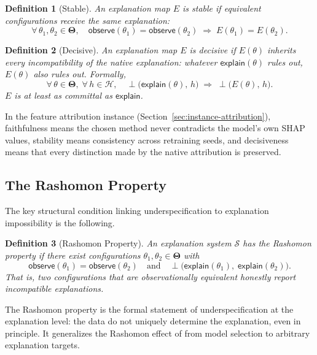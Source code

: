 \documentclass{article}
\newtheorem{definition}{Definition}
\newcommand{\Params}{\mathbf{\Theta}}         %
\newcommand{\sH}{\mathcal{H}}
\newcommand{\incomp}{\perp}                  %
\begin{document}
\begin{definition}[Stable]
\label{def:stable}
An explanation map $E$ is \emph{stable} if equivalent configurations receive
the same explanation:
\[
  \forall\,\theta_1, \theta_2 \in \Params,\quad
  \mathsf{observe}(\theta_1) = \mathsf{observe}(\theta_2)
  \;\Longrightarrow\;
  E(\theta_1) = E(\theta_2).
\]
\end{definition}

\begin{definition}[Decisive]
\label{def:decisive}
An explanation map $E$ is \emph{decisive} if $E(\theta)$ inherits every
incompatibility of the native explanation: whatever
$\mathsf{explain}(\theta)$ rules out, $E(\theta)$ also rules out.  Formally,
\[
  \forall\,\theta \in \Params,\;\forall\,h \in \sH,\quad
  \incomp\bigl(\mathsf{explain}(\theta),\, h\bigr)
  \;\Longrightarrow\;
  \incomp\bigl(E(\theta),\, h\bigr).
\]
$E$ is at least as committal as $\mathsf{explain}$.
\end{definition}

In the feature attribution instance (Section~\ref{sec:instance-attribution}),
faithfulness means the chosen method never contradicts the model's own SHAP
values, stability means consistency across retraining seeds, and decisiveness
means that every distinction made by the native attribution is preserved.

\subsection{The Rashomon Property}

The key structural condition linking underspecification to explanation
impossibility is the following.

\begin{definition}[Rashomon Property]
\label{def:rashomon}
An explanation system $\mathcal{S}$ has the \emph{Rashomon property} if there
exist configurations $\theta_1, \theta_2 \in \Params$ with
\[
  \mathsf{observe}(\theta_1) = \mathsf{observe}(\theta_2)
  \quad\text{and}\quad
  \incomp\bigl(\mathsf{explain}(\theta_1),\;\mathsf{explain}(\theta_2)\bigr).
\]
That is, two configurations that are observationally equivalent honestly report
incompatible explanations.
\end{definition}

The Rashomon property is the formal statement of underspecification at the
explanation level: the data do not uniquely determine the explanation, even in
principle.  It generalizes the Rashomon effect of
\citet{rudin2024amazing,fisher2019models} from model selection to arbitrary
explanation targets.
\end{document}
